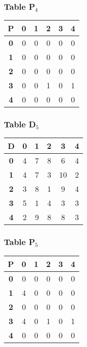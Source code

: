 \begin{frame}
\frametitle{Table P$_{4}$}
\begin{center}
    \begin{tabular}{|c||c|c|c|c|c|}
        \hline
        \textbf{P} & \textbf{0} & \textbf{1} & \textbf{2} & \textbf{3} & \textbf{4} \\
        \hline
        \hline
        \textbf{0}& 0 & 0 & 0 & 0 & 0 \\
        \hline
        \textbf{1}& 0 & 0 & 0 & 0 & 0 \\
        \hline
        \textbf{2}& 0 & 0 & 0 & 0 & 0 \\
        \hline
        \textbf{3}& 0 & 0 & 1 & 0 & 1 \\
        \hline
        \textbf{4}& 0 & 0 & 0 & 0 & 0 \\
        \hline
    \end{tabular}
\end{center}


\end{frame}


\begin{frame}
\frametitle{Table D$_{5}$}
\begin{center}
    \begin{tabular}{|c||c|c|c|c|c|}
        \hline
        \textbf{D} & \textbf{0} & \textbf{1} & \textbf{2} & \textbf{3} & \textbf{4} \\
        \hline
        \hline
        \textbf{0}& 4 & 7 & 8 & 6 & 4 \\
        \hline
        \textbf{1}& \cellcolor{yellow}4 & 7 & 3 & 10 & 2 \\
        \hline
        \textbf{2}& 3 & 8 & 1 & 9 & 4 \\
        \hline
        \textbf{3}& \cellcolor{yellow}5 & 1 & 4 & 3 & 3 \\
        \hline
        \textbf{4}& 2 & 9 & 8 & 8 & 3 \\
        \hline
    \end{tabular}
\end{center}


\end{frame}


\begin{frame}
\frametitle{Table P$_{5}$}
\begin{center}
    \begin{tabular}{|c||c|c|c|c|c|}
        \hline
        \textbf{P} & \textbf{0} & \textbf{1} & \textbf{2} & \textbf{3} & \textbf{4} \\
        \hline
        \hline
        \textbf{0}& 0 & 0 & 0 & 0 & 0 \\
        \hline
        \textbf{1}& \cellcolor{yellow}4 & 0 & 0 & 0 & 0 \\
        \hline
        \textbf{2}& 0 & 0 & 0 & 0 & 0 \\
        \hline
        \textbf{3}& \cellcolor{yellow}4 & 0 & 1 & 0 & 1 \\
        \hline
        \textbf{4}& 0 & 0 & 0 & 0 & 0 \\
        \hline
    \end{tabular}
\end{center}


\end{frame}